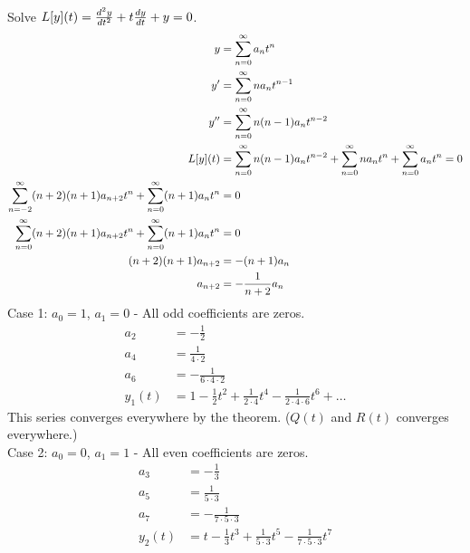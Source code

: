 \documentclass[12pt]{article}
\begin{document}
\begin{example} Solve $ L[y](t) = \frac{d^2y}{dt^2} + t\frac{dy}{dt} + y = 0$. $$\begin{aligned} y &= \sum_{n = 0}^{\infty} a_nt^n \\ y' &= \sum_{n = 0}^{\infty} na_nt^{n - 1} \\ y'' &= \sum_{n = 0}^{\infty} n(n - 1)a_nt^{n-  2} \\ L[y](t) &= \sum_{n = 0}^{\infty} n(n - 1)a_nt^{n - 2} + \sum_{n = 0}^{\infty} na_nt^n + \sum_{n = 0}^{\infty} a_nt^n = 0 \\ \sum_{n = -2}^{\infty} (n + 2)(n + 1)a_{n + 2}t^n + \sum_{n = 0}^{\infty} (n + 1)a_nt^n &= 0 \\ \sum_{n = 0}^{\infty} (n + 2)(n + 1)a_{n + 2}t^n + \sum_{n = 0}^{\infty} (n + 1)a_nt^n &= 0 \\ (n + 2)(n + 1)a_{n + 2} &= -(n + 1)a_n \\ a_{n + 2} &= -\frac{1}{n + 2}a_n \end{aligned}$$  Case 1: $a_0 = 1$, $a_1 = 0$ - All odd coefficients are zeros. $$\begin{aligned} a_2 &= -\frac{1}{2} \\ a_4 &= \frac{1}{4 \cdot 2} \\ a_6 &= -\frac{1}{6 \cdot 4 \cdot 2} \\ y_1(t) &= 1 - \frac{1}{2}t^2 + \frac{1}{2 \cdot 4}t^4 - \frac{1}{2 \cdot 4 \cdot 6}t^6 + \dots \end{aligned} $$ 
This series converges everywhere by the theorem. ($Q(t)$ and $R(t)$ converges everywhere.) \\ 
Case 2: $a_0 = 0$, $a_1 = 1$ - All even coefficients are zeros. $$\begin{aligned} a_3 &= -\frac{1}{3} \\ a_5 &= \frac{1}{5 \cdot 3} \\ a_7 &= -\frac{1}{7 \cdot 5 \cdot 3} \\ y_2(t) &= t - \frac{1}{3}t^3 + \frac{1}{5 \cdot 3}t^5 - \frac{1}{7 \cdot 5 \cdot 3}t^7 \end{aligned} $$ \end{example} 
\end{document}
